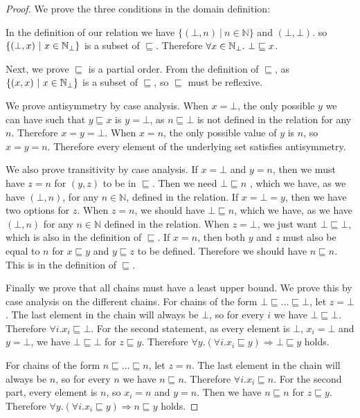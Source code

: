 \begin{proof}
We prove the three conditions in the domain definition:

In the definition of our relation we have $\{ (\bot , n) \ | \ n \in \mathbb{N} \}$ and $(\bot , \bot)$. so $\{(\bot , x) \ | \ x \in \mathbb{N}_{\bot}\}$ is a subset of $\sqsubseteq$. Therefore $\forall x \in \mathbb{N}_{\bot}. \ \bot \sqsubseteq x$.

Next, we prove $\sqsubseteq$ is a partial order. From the  definition of $\sqsubseteq$, as $\{(x,x) \ | \ x \in \mathbb{N}_{\bot} \}$ is a subset of $\sqsubseteq$, so $\sqsubseteq$ must be reflexive.

We prove antisymmetry by case analysis. When $x = \bot$, the only possible $y$ we can have such that $y \sqsubseteq x$ is $y = \bot$, as  $n \sqsubseteq \bot$ is not defined in the relation for any $n$. Therefore $x = y = \bot$. When $x = n$, the only possible value of $y$ is $n$, so $x = y = n$. Therefore every element of the underlying set satisfies antisymmetry.

We also prove transitivity by case analysis. If $x = \bot$ and $y =n$, then we must have $z = n$ for $(y,z)$ to be in $\sqsubseteq$. Then we need $\bot \sqsubseteq n$ , which we have, as we have $(\bot, n)$, for any $n \in \mathbb{N}$, defined in the relation. If $x = \bot = y$, then we have two options for $z$. When $z = n$, we should have $\bot \sqsubseteq n$, which we have, as we have $(\bot, n)$ for any $n \in \mathbb{N}$ defined in the relation. When $z = \bot$, we just want $ \bot \sqsubseteq \bot$, which is also in the definition of $\sqsubseteq$. If $x = n$, then both $y$ and $z$ must also be equal to $n$ for $x \sqsubseteq y$ and $y \sqsubseteq z$ to be defined. Therefore we should  have $n \sqsubseteq n$. This is in the definition of $\sqsubseteq$.

Finally we prove that all chains must have a least upper bound. We prove this by case analysis on the different chains. For  chains of the form $\bot \sqsubseteq \dots \sqsubseteq \bot$, let $z = \bot$. The last element in the chain will always be $\bot$, so for every $i$ we have $\bot \sqsubseteq \bot$. Therefore $\forall i . x_i \sqsubseteq \bot$.
For the second statement, as every element is $\bot$, $x_i = \bot$ and $y = \bot$, we have $\bot \sqsubseteq \bot$ for $z \sqsubseteq y$. Therefore $\forall y. (\forall i . x_i \sqsubseteq y) \Rightarrow \bot \sqsubseteq y$ holds.

For chains of the form $n \sqsubseteq \dots \sqsubseteq n$, let $z = n$. The last element in the chain will always be $n$, so for every $n$ we have $n \sqsubseteq n$. Therefore $\forall i . x_i \sqsubseteq n$. For the second part, every element is $n$, so $x_i = n$ and $y = n$. Then we have $n \sqsubseteq n$ for $z \sqsubseteq y$. Therefore $\forall y. (\forall i . x_i \sqsubseteq y) \Rightarrow n \sqsubseteq y$ holds.


\end{proof}
